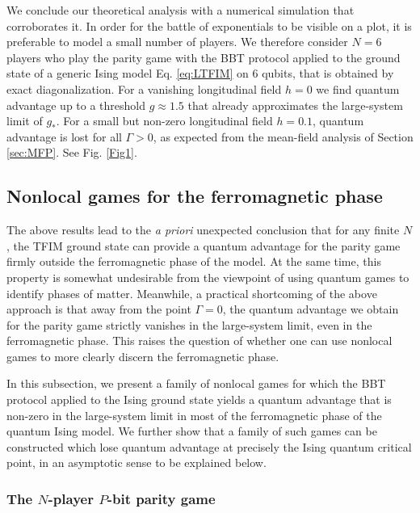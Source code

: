 \documentclass[prb,twocolumn,showpacs,amssymb,superscriptaddress]{revtex4-2}
\begin{document}
We conclude our theoretical analysis with a numerical simulation that corroborates it. In order for the battle of exponentials to be visible on a plot, it is preferable to model a small number of players. We therefore consider $N=6$ players who play the parity game with the BBT protocol applied to the ground state of a generic Ising model Eq. \eqref{eq:LTFIM} on 6 qubits, that is obtained by exact diagonalization. For a vanishing longitudinal field $h=0$ we find quantum advantage up to a threshold $g \approx 1.5$ that already approximates the large-system limit of $g_*$. For a small but non-zero longitudinal field $h=0.1$, quantum advantage is lost for all $\Gamma>0$, as expected from the mean-field analysis of Section \ref{sec:MFP}. See Fig. \ref{Fig1}.

\subsection{Nonlocal games for the ferromagnetic phase}
\label{sec:Pbitparity}

The above results lead to the \emph{a priori} unexpected conclusion that for any finite $N$, the TFIM ground state can provide a quantum advantage for the parity game firmly outside the ferromagnetic phase of the model. At the same time, this property is somewhat undesirable from the viewpoint of using quantum games to identify phases of matter. Meanwhile, a practical shortcoming of the above approach is that away from the point $\Gamma = 0$, the quantum advantage we obtain for the parity game strictly vanishes in the large-system limit, even in the ferromagnetic phase. This raises the question of whether one can use nonlocal games to more clearly discern the ferromagnetic phase.

In this subsection, we present a family of nonlocal games for which the BBT protocol applied to the Ising ground state yields a quantum advantage that is non-zero in the large-system limit in most of the ferromagnetic phase of the quantum Ising model. We further show that a family of such games can be constructed which lose quantum advantage at precisely the Ising quantum critical point, in an asymptotic sense to be explained below.

\subsubsection{The $N$-player $P$-bit parity game}
\end{document}
